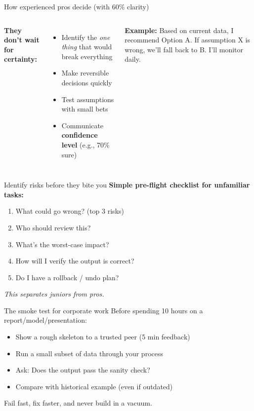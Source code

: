 \documentclass[aspectratio=169, 11pt]{beamer}
\begin{document}
	\begin{frame}{How experienced pros decide (with 60\% clarity)}
		\begin{columns}
			\textbf{They don't wait for certainty:}
			\begin{itemize}
				\item Identify the \textit{one thing} that would break everything
				\item Make reversible decisions quickly
				\item Test assumptions with small bets
				\item Communicate \textbf{confidence level} (e.g., 70\% sure)
			\end{itemize}
			\textbf{Example:}
		 Based on current data, I recommend Option A. If assumption X is wrong, we'll fall back to B. I'll monitor daily. 
		\end{columns}
	\end{frame}
	
	\begin{frame}{Identify risks before they bite you}
		\textbf{Simple pre-flight checklist for unfamiliar tasks:}
		\begin{enumerate}
			\item What could go wrong? (top 3 risks)
			\item Who should review this?
			\item What's the worst-case impact?
			\item How will I verify the output is correct?
			\item Do I have a rollback / undo plan?
		\end{enumerate}
		\vspace{0.2cm}
		\textit{This separates juniors from pros.}
	\end{frame}
	
	\begin{frame}{The   smoke test  for corporate work}
		Before spending 10 hours on a report/model/presentation:
		\begin{itemize}
			\item Show a rough skeleton to a trusted peer (5 min feedback)
			\item Run a small subset of data through your process
			\item Ask:   Does the output pass the sanity check? 
			\item Compare with historical example (even if outdated)
		\end{itemize}
		\alert{Fail fast, fix faster, and never build in a vacuum.}
	\end{frame}
	
\end{document}

